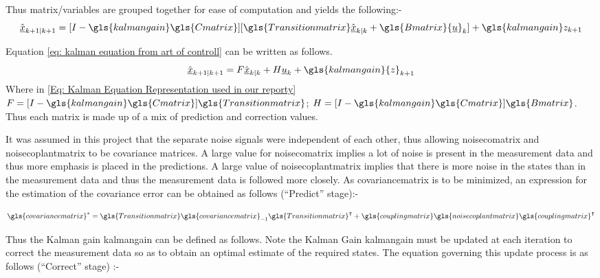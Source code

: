 Thus matrix/variables are grouped together for ease of computation and yields the following:- 
\begin{equation}
\hat{\underline{x}}_{k+1|k+1} = [{I -\gls{kalmangain}\gls{Cmatrix}}][\gls{Transitionmatrix} \hat{\underline{x}}_{k|k} +\gls{Bmatrix} {\underline{u}}_k] + \gls{kalmangain}z_{k+1} \label{eq: kalman equation from art of controll}
\end{equation}

Equation \ref{eq: kalman equation from art of controll} can be written as follows.
\begin{equation}
\hat{\underline{x}}_{k+1|k+1} = { F}\hat{\underline{x}}_{k|k} + { H}{\underline{u}}_k + \gls{kalmangain}{z}_{k+1} \label{Eq: Kalman Equation Representation used in our reporty}
\end{equation}
Where in \eqref{Eq: Kalman Equation Representation used in our reporty} ${ F} =  [{I -\gls{kalmangain} \gls{Cmatrix} }]\gls{Transitionmatrix}$; $H =  [{I -\gls{kalmangain} \gls{Cmatrix} }] \gls{Bmatrix} $. Thus each matrix is made up of a mix of prediction and correction values.

It was assumed in this project that the separate noise signals were independent of each other, thus allowing \gls{noisecomatrix} and \gls{noisecoplantmatrix} to be covariance matrices. A large value for \gls{noisecomatrix} implies a lot of noise is present in the measurement data and thus more emphasis is placed in the predictions. A large value of \gls{noisecoplantmatrix} implies that there is more noise in the states than in the measurement data and thus the measurement data is followed more closely. As \gls{covariancematrix} is to be minimized, an expression for the estimation of the covariance error can be obtained as follows (\enquote{Predict} stage):-

\begin{equation}
\gls{covariancematrix}^* = \gls{Transitionmatrix}\gls{covariancematrix}_{-1}\gls{Transitionmatrix}^{\intercal} + \gls{couplingmatrix}\gls{noisecoplantmatrix}\gls{couplingmatrix}^{\intercal} \label{eq: P equation for the kalman filter}
\end{equation}

Thus the Kalman gain \gls{kalmangain} can be defined as follows. Note the Kalman Gain \gls{kalmangain} must be updated at each iteration to correct the measurement data so as to obtain an optimal estimate of the required states. The equation governing this update process is as follows (\enquote{Correct} stage) :-

